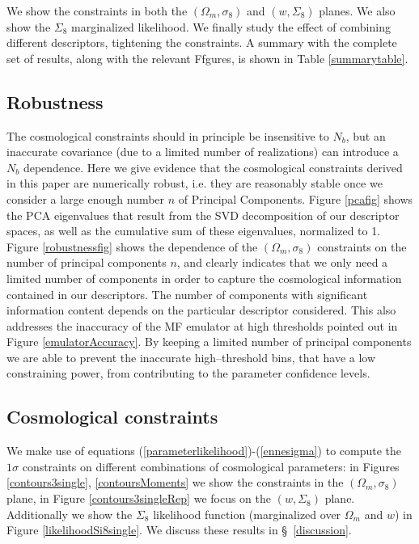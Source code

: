 \documentclass[reprint,aps,prd,superscriptaddress,showkeys,showpacs]{revtex4-1}
\begin{document}
We show the constraints in both the $(\Omega_m,\sigma_8)$ and $(w,\Sigma_8)$ planes. We also show the $\Sigma_8$ marginalized likelihood. We finally study the effect of combining different descriptors, tightening the constraints. A summary with the complete set of results, along with the relevant Ffgures, is shown in Table \ref{summarytable}. 


\subsection{Robustness}
%
The cosmological constraints should in principle be insensitive to $N_b$, but an inaccurate covariance (due to a limited number of realizations) can introduce a $N_b$ dependence. Here we give evidence that the cosmological constraints derived in this paper are numerically robust, i.e. they are reasonably stable once we consider a large enough number $n$ of Principal Components. 
Figure \ref{pcafig} shows the PCA eigenvalues that result from the SVD decomposition of our descriptor spaces, as well as the cumulative sum of these eigenvalues, normalized to 1. Figure \ref{robustnessfig} shows the dependence of the $(\Omega_m,\sigma_8)$ constraints on the number of principal components $n$, and clearly indicates that we only need a limited number of components in order to capture the cosmological information contained in our descriptors. The number of components with significant information content depends on the particular descriptor considered. This also addresses the inaccuracy of the MF emulator at high thresholds pointed out in Figure \ref{emulatorAccuracy}. By keeping a limited number of principal components we are able to prevent the inaccurate high--threshold bins, that have a low constraining power, from contributing to the parameter confidence levels.    


\subsection{Cosmological constraints}
%
We make use of equations (\ref{parameterlikelihood})-(\ref{ennesigma}) to compute the $1\sigma$ constraints on different combinations of cosmological parameters: in Figures \ref{contours3single}, \ref{contoursMoments} we show the constraints in the $(\Omega_m,\sigma_8)$ plane, in Figure \ref{contours3singleRep} we focus on the $(w,\Sigma_8)$ plane. Additionally we show the $\Sigma_8$ likelihood function (marginalized over $\Omega_m$ and $w$) in Figure \ref{likelihoodSi8single}. We discuss these results in \S~\ref{discussion}. 
\end{document}
